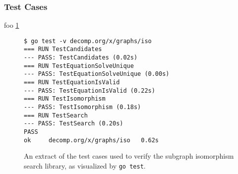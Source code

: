 
\subsubsection{Test Cases}





foo \ref{fig:iso_test_cases}

\begin{figure}[htbp]
	\begin{center}
		\begin{verbatim}
$ go test -v decomp.org/x/graphs/iso
=== RUN TestCandidates
--- PASS: TestCandidates (0.02s)
=== RUN TestEquationSolveUnique
--- PASS: TestEquationSolveUnique (0.00s)
=== RUN TestEquationIsValid
--- PASS: TestEquationIsValid (0.22s)
=== RUN TestIsomorphism
--- PASS: TestIsomorphism (0.18s)
=== RUN TestSearch
--- PASS: TestSearch (0.20s)
PASS
ok     decomp.org/x/graphs/iso   0.62s
		\end{verbatim}
		\caption{An extract of the test cases used to verify the subgraph isomorphism search library, as visualized by \texttt{go test}.}
		\label{fig:iso_test_cases}
	\end{center}
\end{figure}
